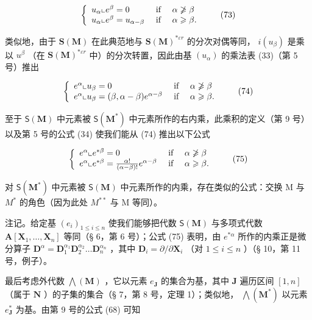 \[
\left\{ \begin{array}{l l} u _ {\alpha} \llcorner e ^ {\beta} = 0 & \text { if } \quad \alpha \not \geqslant \beta \\ u _ {\alpha} \llcorner e ^ {\beta} = u _ {\alpha - \beta} & \text { if } \quad \alpha \geqslant \beta . \end{array} \right.\tag{73}
\]

类似地，由于 \(\mathbf{S}(\mathbf{M})\) 在此典范地与 \(\mathbf{S}(\mathbf{M})^{*\varepsilon r}\) 的分次对偶等同， \(i(u_{\beta})\) 是乘以 \(u^{\beta}\) （在 \(\mathbf{S}(\mathbf{M})^{*\varepsilon r}\) 中）的分次转置，因此由基 \((u_{\alpha})\) 的乘法表 (33)（第 5 号）推出

\[
\left\{ \begin{array}{l l} e ^ {\alpha} \llcorner u _ {\beta} = 0 & \text { if } \quad \alpha \not \geqslant \beta \\ e ^ {\alpha} \llcorner u _ {\beta} = (\beta , \alpha - \beta) e ^ {\alpha - \beta} & \text { if } \quad \alpha \geqslant \beta . \end{array} \right.\tag{74}
\]

至于 \(\mathsf{S}(\mathbf{M})\) 中元素被 \(\mathsf{S}(\mathbf{M}^*)\) 中元素所作的右内乘，此乘积的定义（第 9 号）以及第 5 号的公式 (34) 使我们能从 (74) 推出以下公式

\[
\left\{ \begin{array}{l l} e ^ {\alpha} \llcorner e ^ {* \beta} = 0 & \text { if } \quad \alpha \not \geqslant \beta \\ e ^ {\alpha} \llcorner e ^ {* \beta} = \frac {\alpha !}{(\alpha - \beta) !} e ^ {\alpha - \beta} & \text { if } \quad \alpha \geqslant \beta . \end{array} \right.\tag{75}
\]

对 \(\mathsf{S}(\mathbf{M}^{*})\) 中元素被 \(\mathsf{S}(\mathbf{M})\) 中元素所作的内乘，存在类似的公式：交换 M 与 \(M^{*}\) 的角色（因为此处 \(M^{**}\) 与 M 等同）。

注记。给定基 \((e_i)_{1\leq i\leq n}\) 使我们能够把代数 \(\mathsf{S}(\mathbf{M})\) 与多项式代数 \(\mathbf{A}[\mathbf{X}_1,\ldots ,\mathbf{X}_n]\) 等同（§ 6，第 6 号）；公式 (75) 表明，由 \(e^{*\alpha}\) 所作的内乘正是微分算子 \(\mathbf{D}^{\alpha} = \mathbf{D}_{1}^{\alpha_{1}}\mathbf{D}_{2}^{\alpha_{2}}\ldots \mathbf{D}_{n}^{\alpha_{n}}\) ，其中 \(\mathbf{D}_i = \partial /\partial \mathbf{X}_i\) （对 \(1\leqslant i\leqslant n\) ）（§ 10，第 11 号，例子）。

最后考虑外代数 \(\bigwedge (\mathbf{M})\) ，它以元素 \(e_{\mathbf{J}}\) 的集合为基，其中 \(\mathbf{J}\) 遍历区间 \([1, n]\) （属于 \(\mathbf{N}\) ）的子集的集合（§ 7，第 8 号，定理 1）；类似地， \(\bigwedge (\mathbf{M}^*)\) 以元素 \(e_{\mathbf{J}}^{*}\) 为基。由第 9 号的公式 (68) 可知

